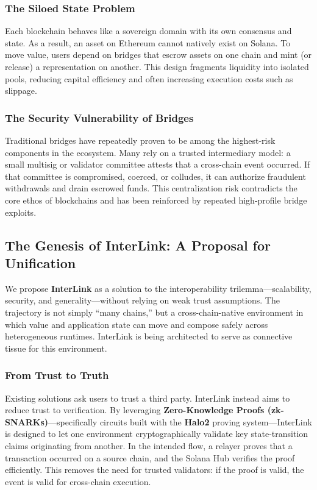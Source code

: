 \documentclass[11pt,a4paper]{article}
\begin{document}
\subsubsection{The Siloed State Problem}
Each blockchain behaves like a sovereign domain with its own consensus and state. As a result, an asset on Ethereum cannot natively exist on Solana. To move value, users depend on bridges that escrow assets on one chain and mint (or release) a representation on another. This design fragments liquidity into isolated pools, reducing capital efficiency and often increasing execution costs such as slippage.

\subsubsection{The Security Vulnerability of Bridges}
Traditional bridges have repeatedly proven to be among the highest-risk components in the ecosystem. Many rely on a trusted intermediary model: a small multisig or validator committee attests that a cross-chain event occurred. If that committee is compromised, coerced, or colludes, it can authorize fraudulent withdrawals and drain escrowed funds. This centralization risk contradicts the core ethos of blockchains and has been reinforced by repeated high-profile bridge exploits.

\subsection{The Genesis of InterLink: A Proposal for Unification}
We propose \textbf{InterLink} as a solution to the interoperability trilemma---scalability, security, and generality---without relying on weak trust assumptions. The trajectory is not simply ``many chains,'' but a cross-chain-native environment in which value and application state can move and compose safely across heterogeneous runtimes. InterLink is being architected to serve as connective tissue for this environment.

\subsubsection{From Trust to Truth}
Existing solutions ask users to trust a third party. InterLink instead aims to reduce trust to verification. By leveraging \textbf{Zero-Knowledge Proofs (zk-SNARKs)}---specifically circuits built with the \textbf{Halo2} proving system---InterLink is designed to let one environment cryptographically validate key state-transition claims originating from another. In the intended flow, a relayer proves that a transaction occurred on a source chain, and the Solana Hub verifies the proof efficiently. This removes the need for trusted validators: if the proof is valid, the event is valid for cross-chain execution.
\end{document}
